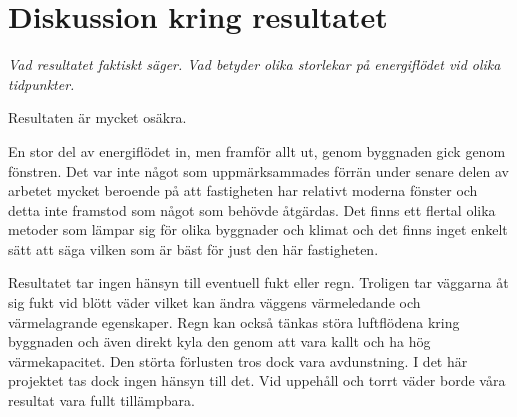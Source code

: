\section{Diskussion kring resultatet}

\emph{\color{red} Vad resultatet faktiskt säger. Vad betyder olika storlekar på energiflödet vid olika tidpunkter.}

Resultaten är mycket osäkra.

En stor del av energiflödet in, men framför allt ut, genom byggnaden gick genom fönstren. Det var inte något som uppmärksammades förrän under senare delen av arbetet mycket beroende på att fastigheten har relativt moderna fönster och detta inte framstod som något som behövde åtgärdas. Det finns ett flertal olika metoder som lämpar sig för olika byggnader och klimat och det finns inget enkelt sätt att säga vilken som är bäst för just den här fastigheten.

Resultatet tar ingen hänsyn till eventuell fukt eller regn. Troligen tar väggarna åt sig fukt vid blött väder vilket kan ändra väggens värmeledande och värmelagrande egenskaper. Regn kan också tänkas störa luftflödena kring byggnaden och även direkt kyla den genom att vara kallt och ha hög värmekapacitet. Den störta förlusten tros dock vara avdunstning. I det här projektet tas dock ingen hänsyn till det. Vid uppehåll och torrt väder borde våra resultat vara fullt tillämpbara.
